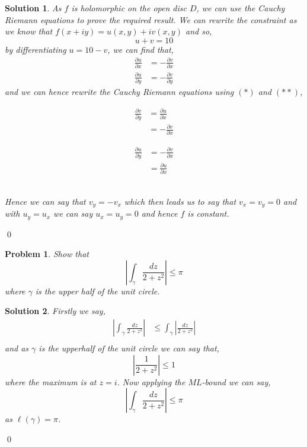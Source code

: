 \documentclass{article}
\newcommand{\g}{\gamma}
\newcommand{\pd}[2]{\frac{\partial #1}{\partial #2}}
\newtheorem{problem}{Problem}
\newtheorem{solution}{Solution}
\begin{document}
\begin{solution}
  As $f$ is holomorphic on the open disc $D$, we can use the Cauchy Riemann equations to prove the required result. We can rewrite the constraint as we know that $f(x + iy) = u(x, y) + iv(x, y)$ and so,
  $$ u + v = 10 $$
  by differentiating $u = 10 - v$, we can find that,
  \begin{align}
    \pd{u}{x} &= - \pd{v}{x} \tag{$*$}\\
    \pd{u}{y} &= - \pd{v}{y} \tag{$**$}
  \end{align}
  and we can hence rewrite the Cauchy Riemann equations using $(*)$ and $(**)$,\\
  \begin{minipage}{0.48\textwidth}
    \begin{align*}
      \pd{v}{y} &= \pd{u}{x}\\
      &= -\pd{v}{x}
    \end{align*}
  \end{minipage}
  \begin{minipage}{0.48\textwidth}
    \begin{align*}
      \pd{u}{y} &= -\pd{v}{x}\\
      &= \pd{u}{x}
    \end{align*}
  \end{minipage}\\

  \noindent
  Hence we can say that $v_y = -v_x$ which then leads us to say that $v_x = v_y = 0$ and with $u_y = u_x$ we can say $u_x = u_y = 0$ and hence $f$ is constant.
\end{solution}\qed

\newpage
\begin{problem}
  Show that
  $$ \left | \int_\g \frac{dz}{2 + z^2} \right | \le \pi $$
  where $\g$ is the upper half of the unit circle.
\end{problem}

\begin{solution}
  Firstly we say,
  \begin{align*}
    \left | \int_\g \frac{dz}{2 + z^2} \right | &\le \int_\g\left | \frac{dz}{2 + z^2} \right |\\
  \end{align*}
  and as $\g$ is the upperhalf of the unit circle we can say that,
  $$ \left | \frac{1}{2 + z^2} \right | \le 1 $$
  where the maximum is at $z = i$. Now applying the $ML$-bound we can say,
  $$ \left | \int_\g \frac{dz}{2 + z^2} \right | \le \pi $$
  as $\ell (\g) = \pi$.
\end{solution}\qed
\end{document}
